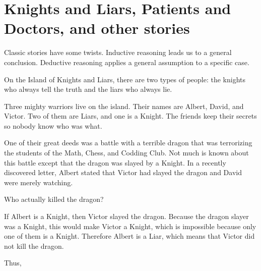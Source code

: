\documentclass{article}
\begin{document}
\section*{Knights and Liars, Patients and Doctors, and other stories}

Classic stories have some twists. Inductive reasoning leads us to a general conclusion.
Deductive reasoning applies a general assumption to a specific case.

\begin{example*}
    \label{example:pi-2022-4-p10}
    On the Island of Knights and Liars, there are two types of people:
    the knights who always tell the truth and the liars who always lie.

    Three mighty warriors live on the island.
    Their names are Albert, David, and Victor.
    Two of them are Liars, and one is a Knight.
    The friends keep their secrets so nobody know who was what.

    One of their great deeds was a battle with a terrible dragon
    that was terrorizing the students of the Math, Chess, and Codding Club.
    Not much is known about this battle except that the dragon was slayed by a Knight.
    In a recently discovered letter, Albert stated that Victor had slayed the dragon
    and David were merely watching.

    Who actually killed the dragon?
\end{example*}

\begin{soln} 
    If Albert is a Knight, then Victor slayed the dragon.
    Because the dragon slayer was a Knight, this would make Victor a Knight,
    which is impossible because only one of them is a Knight.
    Therefore Albert is a Liar, which means that Victor did not kill the dragon.
    
    Thus, 
\end{soln}
\end{document}
